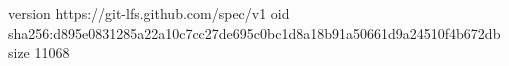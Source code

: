 version https://git-lfs.github.com/spec/v1
oid sha256:d895e0831285a22a10c7cc27de695c0bc1d8a18b91a50661d9a24510f4b672db
size 11068
